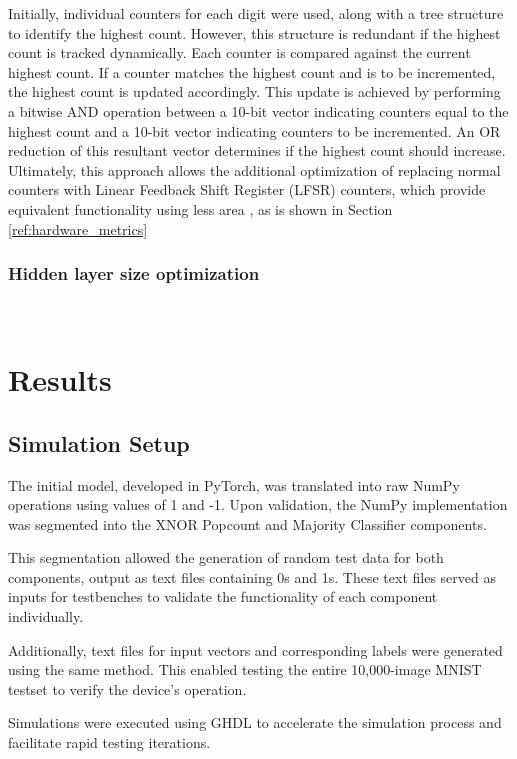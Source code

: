 \documentclass[conference]{IEEEtran}
\newcounter{todocount}
\newcommand{\todo}[1]{
  \stepcounter{todocount}
}
\begin{document}
Initially, individual counters for each digit were used, along with a tree structure to identify the highest count. However, this structure is redundant if the highest count is tracked dynamically. Each counter is compared against the current highest count. If a counter matches the highest count and is to be incremented, the highest count is updated accordingly. This update is achieved by performing a bitwise AND operation between a 10-bit vector indicating counters equal to the highest count and a 10-bit vector indicating counters to be incremented. An OR reduction of this resultant vector determines if the highest count should increase. 
Ultimately, this approach allows the additional optimization of replacing normal counters with Linear Feedback Shift Register (LFSR) counters, which provide equivalent functionality using less area \cite{xilinx_lfsr}, as is shown in Section \ref{ref:hardware_metrics}

\subsubsection{Hidden layer size optimization}
\hfill\\
\todo{ref to hidden size optimization}


\section{Results}
\label{sec:results}
\subsection{Simulation Setup}

The initial model, developed in PyTorch, was translated into raw NumPy operations using values of 1 and -1. Upon validation, the NumPy implementation was segmented into the XNOR Popcount and Majority Classifier components.

This segmentation allowed the generation of random test data for both components, output as text files containing 0s and 1s. These text files served as inputs for testbenches to validate the functionality of each component individually.

Additionally, text files for input vectors and corresponding labels were generated using the same method. This enabled testing the entire 10,000-image MNIST \cite{mnist} testset to verify the device's operation.

Simulations were executed using GHDL \cite{ghdl} to accelerate the simulation process and facilitate rapid testing iterations.
\end{document}

